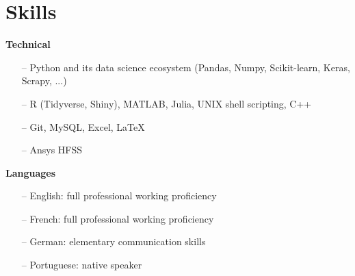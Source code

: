 \section{Skills} 

{\bf Technical} \\
\begin{itemize}
	\item[--] Python and its data science ecosystem (Pandas, Numpy, Scikit-learn, Keras, Scrapy, ...)
	\item[--] R (Tidyverse, Shiny), MATLAB, Julia, UNIX shell scripting, C++
	\item[--] Git, MySQL, Excel, \LaTeX
	\item[--] Ansys HFSS 
\end{itemize}

{\bf Languages} \\
\begin{itemize}
	\item[--] English: full professional working proficiency
	\item[--] French: full professional working proficiency
	\item[--] German: elementary communication skills
	\item[--] Portuguese: native speaker
\end{itemize}